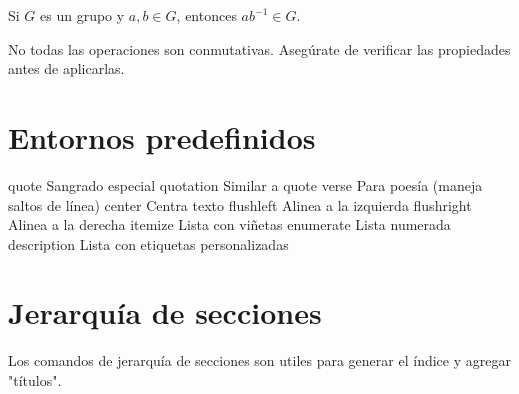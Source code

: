 \begin{theorem}
  Si \( G \) es un grupo y \( a, b \in G \), entonces \( ab^{-1} \in G \).
\end{theorem}

\begin{warnbox}
  No todas las operaciones son conmutativas. Asegúrate de verificar las propiedades antes de aplicarlas.
\end{warnbox}
    
 \section{Entornos predefinidos} 
 
  quote	      Sangrado especial
  quotation	  Similar a quote
  verse	      Para poesía (maneja saltos de línea)
  center	    Centra texto
  flushleft	  Alinea a la izquierda
  flushright	Alinea a la derecha
  itemize	    Lista con viñetas
  enumerate	  Lista numerada
  description	Lista con etiquetas personalizadas
 

\section{Jerarquía de secciones}

Los comandos de jerarquía de secciones son utiles para generar el índice y agregar "títulos". 

